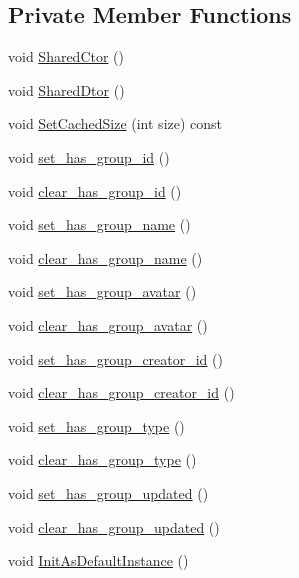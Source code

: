 \subsection*{Private Member Functions}
\begin{DoxyCompactItemize}
\item 
void \hyperlink{class_i_m_1_1_base_define_1_1_server_group_info_a0c546dcddee96e33322d3b7fd7620dbf}{Shared\+Ctor} ()
\item 
void \hyperlink{class_i_m_1_1_base_define_1_1_server_group_info_a1989f474bdb8bab5af011a5086899bc7}{Shared\+Dtor} ()
\item 
void \hyperlink{class_i_m_1_1_base_define_1_1_server_group_info_af122ed60c5e827533757ee069b98e515}{Set\+Cached\+Size} (int size) const 
\item 
void \hyperlink{class_i_m_1_1_base_define_1_1_server_group_info_a8af0a74d25f4f2b2f59394eb510592eb}{set\+\_\+has\+\_\+group\+\_\+id} ()
\item 
void \hyperlink{class_i_m_1_1_base_define_1_1_server_group_info_a5c3e85427c19f5dee85ede79586c869e}{clear\+\_\+has\+\_\+group\+\_\+id} ()
\item 
void \hyperlink{class_i_m_1_1_base_define_1_1_server_group_info_a091a24f7310a207c6e0ffaf5886ddbde}{set\+\_\+has\+\_\+group\+\_\+name} ()
\item 
void \hyperlink{class_i_m_1_1_base_define_1_1_server_group_info_a9f8f0a7255a73adf9556454f52eab815}{clear\+\_\+has\+\_\+group\+\_\+name} ()
\item 
void \hyperlink{class_i_m_1_1_base_define_1_1_server_group_info_addc58d6ee7e522f7618e936d1961b2f0}{set\+\_\+has\+\_\+group\+\_\+avatar} ()
\item 
void \hyperlink{class_i_m_1_1_base_define_1_1_server_group_info_a7a0eaeffee90b854a5be2cbd63ead93f}{clear\+\_\+has\+\_\+group\+\_\+avatar} ()
\item 
void \hyperlink{class_i_m_1_1_base_define_1_1_server_group_info_aa4a11788a6a7af4990bb4c7b36d323ee}{set\+\_\+has\+\_\+group\+\_\+creator\+\_\+id} ()
\item 
void \hyperlink{class_i_m_1_1_base_define_1_1_server_group_info_a3d4e70f4c3482040342cc7804b6b92ac}{clear\+\_\+has\+\_\+group\+\_\+creator\+\_\+id} ()
\item 
void \hyperlink{class_i_m_1_1_base_define_1_1_server_group_info_ae3b6bd59b9e7274568aebb86ea547dc9}{set\+\_\+has\+\_\+group\+\_\+type} ()
\item 
void \hyperlink{class_i_m_1_1_base_define_1_1_server_group_info_a442e8b9b9dc4b98d54e7a42213b63c55}{clear\+\_\+has\+\_\+group\+\_\+type} ()
\item 
void \hyperlink{class_i_m_1_1_base_define_1_1_server_group_info_a3dae343c7c68894c8e342c3276fe4ebe}{set\+\_\+has\+\_\+group\+\_\+updated} ()
\item 
void \hyperlink{class_i_m_1_1_base_define_1_1_server_group_info_ac10b0994e93a01b4e6ebbab1963a188b}{clear\+\_\+has\+\_\+group\+\_\+updated} ()
\item 
void \hyperlink{class_i_m_1_1_base_define_1_1_server_group_info_ab1ab5971391f952a5e5a48c467be8b0b}{Init\+As\+Default\+Instance} ()
\end{DoxyCompactItemize}
